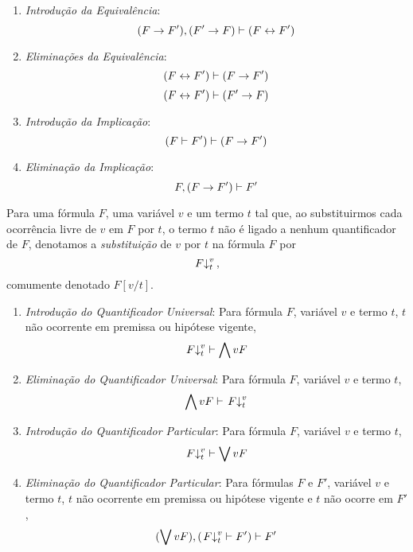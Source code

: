 \begin{enumerate}
\item \emph{Introdução da Equivalência}:
	\begin{equation*}
	(F \rightarrow F'), (F' \rightarrow F) \vdash (F \leftrightarrow F')
	\end{equation*}

\item \emph{Eliminações da Equivalência}:
	\begin{equation*}
	(F \leftrightarrow F') \vdash (F \rightarrow F')
	\end{equation*}
	\begin{equation*}
	(F \leftrightarrow F') \vdash (F' \rightarrow F)
	\end{equation*}

\item \emph{Introdução da Implicação}:
	\begin{equation*}
	(F \vdash F') \vdash (F \rightarrow F')
	\end{equation*}

\item \emph{Eliminação da Implicação}:
	\begin{equation*}
	F, (F \rightarrow F') \vdash F'
	\end{equation*}
\end{enumerate}

Para uma fórmula $F$, uma variável $v$ e um termo $t$ tal que, ao substituirmos cada ocorrência livre de $v$ em $F$ por $t$, o termo $t$ não é ligado a nenhum quantificador de $F$, denotamos a \emph{substituição} de $v$ por $t$ na fórmula $F$ por
	\begin{equation*}
	\left. {F} \right\downarrow^{v}_{t},
	\end{equation*}
comumente denotado $F[v/t]$.

\begin{enumerate}
\item \emph{Introdução do Quantificador Universal}: Para fórmula $F$, variável $v$ e termo $t$, $t$ não ocorrente em premissa ou hipótese vigente,
	\begin{equation*}
	\left. {F} \right\downarrow^{v}_{t} \vdash \bigwedge\nolimits v F
	\end{equation*}

\item \emph{Eliminação do Quantificador Universal}: Para fórmula $F$, variável $v$ e termo $t$,
	\begin{equation*}
	\bigwedge\nolimits v F \vdash \left. {F} \right\downarrow^{v}_{t}
	\end{equation*}

\item \emph{Introdução do Quantificador Particular}: Para fórmula $F$, variável $v$ e termo $t$,
	\begin{equation*}
	\left. {F} \right\downarrow^{v}_{t} \vdash \bigvee\nolimits v F
	\end{equation*}

\item \emph{Eliminação do Quantificador Particular}: Para fórmulas $F$ e $F'$, variável $v$ e termo $t$, $t$ não ocorrente em premissa ou hipótese vigente e $t$ não ocorre em $F'$,
	\begin{equation*}
	(\bigvee\nolimits v F), (\left. {F} \right\downarrow^{v}_{t} \vdash F') \vdash F'
	\end{equation*}
\end{enumerate}

